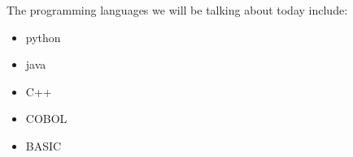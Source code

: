 \documentclass{article}
\begin{document}
	The programming languages we will be talking about today include:
	\begin{itemize}
		\item python
		\item java
		\item C++
		\item COBOL
		\item BASIC
	\end{itemize}
\end{document}

